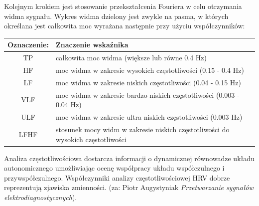 \documentclass[a4paper, 11pt]{article}
\begin{document}
Kolejnym krokiem jest stosowanie przekształcenia Fouriera w celu otrzymania widma sygnału. Wykres widma dzielony jest zwykle na pasma, w których określana jest całkowita moc wyrażana następnie przy użyciu współczynników:

\begin{tabular}{|c|l|}
\hline
Oznaczenie: & Znaczenie wskaźnika \\ \hline
TP & całkowita moc widma (większe lub równe 0.4 Hz)  \\ \hline
HF & moc widma w zakresie wysokich częstotliwości (0.15 - 0.4 Hz) \\ \hline
LF & moc widma w zakresie niskich częstotliwości (0.04 - 0.15 Hz) \\ \hline
VLF & moc widma w zakresie bardzo niskich częstotliwości (0.003 - 0.04 Hz)  \\ \hline
ULF & moc widma w zakresie ultra niskich częstotliwości (0.003 Hz)  \\ \hline
LFHF & stosunek mocy widm w zakresie niskich częstotliwości do wysokich częstotliwości  \\
\hline
\end{tabular}


Analiza częstotliwościowa dostarcza informacji o dynamicznej równowadze układu autonomicznego umożliwiając ocenę współpracy układu współczulnego i przywspółczulnego. Współczynniki analizy częstotliwościowej HRV dobrze reprezentują zjawiska zmienności. (za: Piotr Augystyniak \textit{Przetwarzanie sygnałów elektrodiagnostycznych}).
\end{document}
